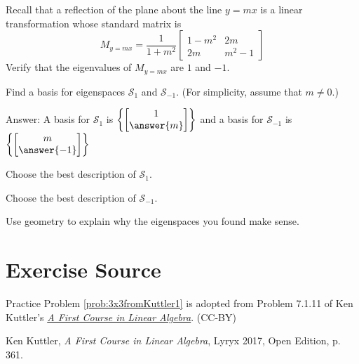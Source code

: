 \documentclass{ximera}
\begin{document}
\begin{problem}\label{prob:eigvectorstransfr2_3}
Recall that a reflection of the plane about the line $y=mx$ is a linear transformation whose standard matrix is
$$M_{y=mx}=\frac{1}{1+m^2}\begin{bmatrix}
1-m^2 & 2m \\
2m & m^2-1
\end{bmatrix}$$
Verify that the eigenvalues of $M_{y=mx}$ are
$1$ and $-1$.
    
Find a basis for eigenspaces $\mathcal{S}_{1}$ and $\mathcal{S}_{-1}$.  (For simplicity, assume that $m\neq 0$.)
    
Answer:  A basis for $\mathcal{S}_{1}$ is $\left\{\begin{bmatrix}1\\\answer{m}\end{bmatrix}\right\}$
and a basis for $\mathcal{S}_{-1}$ is $\left\{\begin{bmatrix}m\\\answer{-1}\end{bmatrix}\right\}$
    
Choose the best description of $\mathcal{S}_{1}$.
\begin{multipleChoice}
\end{multipleChoice}
    
Choose the best description of $\mathcal{S}_{-1}$.
\begin{multipleChoice}
\end{multipleChoice}
    
Use geometry to explain why the eigenspaces you found make sense.
    
\end{problem}
    
    
\section*{Exercise Source}
Practice Problem \ref{prob:3x3fromKuttler1} is adopted from Problem 7.1.11 of Ken Kuttler's \href{https://open.umn.edu/opentextbooks/textbooks/a-first-course-in-linear-algebra-2017}{\it A First Course in Linear Algebra}. (CC-BY)
    
Ken Kuttler, {\it  A First Course in Linear Algebra}, Lyryx 2017, Open Edition, p. 361.
\end{document}
